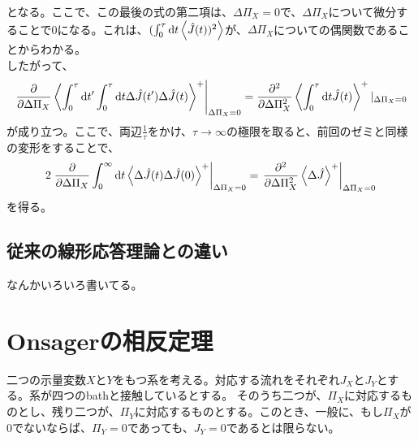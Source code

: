 \documentclass[a4paper,11pt]{jsarticle}
\begin{document}
となる。ここで、この最後の式の第二項は、$\Delta \Pi_X=0$で、$\Delta \Pi_X$について微分することで0になる。これは、$(\int_0 ^{\tau} \dd t \ev{\hat{J}(t))^2}$が、$\Delta \Pi_X$についての偶関数であることからわかる。\\
したがって、
\begin{align} 
    \left.\pdv{\Delta \Pi_X} \ev{\int_0 ^{\tau} \dd t' \int_0 ^{\tau} \dd t \Delta \hat{J}(t')\Delta \hat{J}(t)}^+\right|_{\Delta \Pi_X = 0} = \pdv[2]{\Delta \Pi_X} \ev{\int_0 ^{\tau} \dd t \hat{J}(t)}^+|_{\Delta \Pi_X = 0}
\end{align}
が成り立つ。ここで、両辺$\frac{1}{\tau}$をかけ、$\tau \to \infty$の極限を取ると、前回のゼミと同様の変形をすることで、
\begin{align}
    2\left.\pdv{\Delta \Pi_X} \int_0 ^{\infty} \dd t \ev{\Delta \hat{J}(t) \Delta \hat{J}(0)}^+\right|_{\Delta \Pi_X = 0} = \left.\pdv[2]{\Delta \Pi_X} \ev{\Delta \hat{J}}^+\right|_{\Delta \Pi_X = 0}
\end{align}
を得る。\hfill \qedsymbol

\subsection{従来の線形応答理論との違い}
なんかいろいろ書いてる。\\

\section{Onsagerの相反定理}
二つの示量変数$X$と$Y$をもつ系を考える。対応する流れをそれぞれ$J_X$と$J_Y$とする。系が四つのbathと接触しているとする。
そのうち二つが、$\Pi_X$に対応するものとし、残り二つが、$\Pi_Y$に対応するものとする。このとき、一般に、もし$\Pi_X$が$0$でないならば、$\Pi_Y=0$であっても、$J_Y=0$であるとは限らない。\\
\end{document}

